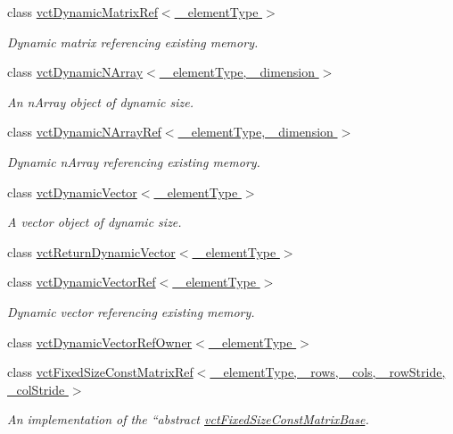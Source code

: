 \begin{DoxyCompactItemize}
class \hyperlink{classvct_dynamic_matrix_ref}{vct\+Dynamic\+Matrix\+Ref$<$ \+\_\+element\+Type $>$}
\begin{DoxyCompactList}\small\item\em Dynamic matrix referencing existing memory. \end{DoxyCompactList}\item 
class \hyperlink{classvct_dynamic_n_array}{vct\+Dynamic\+N\+Array$<$ \+\_\+element\+Type, \+\_\+dimension $>$}
\begin{DoxyCompactList}\small\item\em An n\+Array object of dynamic size. \end{DoxyCompactList}\item 
class \hyperlink{classvct_dynamic_n_array_ref}{vct\+Dynamic\+N\+Array\+Ref$<$ \+\_\+element\+Type, \+\_\+dimension $>$}
\begin{DoxyCompactList}\small\item\em Dynamic n\+Array referencing existing memory. \end{DoxyCompactList}\item 
class \hyperlink{classvct_dynamic_vector}{vct\+Dynamic\+Vector$<$ \+\_\+element\+Type $>$}
\begin{DoxyCompactList}\small\item\em A vector object of dynamic size. \end{DoxyCompactList}\item 
class \hyperlink{classvct_return_dynamic_vector}{vct\+Return\+Dynamic\+Vector$<$ \+\_\+element\+Type $>$}
\item 
class \hyperlink{classvct_dynamic_vector_ref}{vct\+Dynamic\+Vector\+Ref$<$ \+\_\+element\+Type $>$}
\begin{DoxyCompactList}\small\item\em Dynamic vector referencing existing memory. \end{DoxyCompactList}\item 
class \hyperlink{classvct_dynamic_vector_ref_owner}{vct\+Dynamic\+Vector\+Ref\+Owner$<$ \+\_\+element\+Type $>$}
\item 
class \hyperlink{classvct_fixed_size_const_matrix_ref}{vct\+Fixed\+Size\+Const\+Matrix\+Ref$<$ \+\_\+element\+Type, \+\_\+rows, \+\_\+cols, \+\_\+row\+Stride, \+\_\+col\+Stride $>$}
\begin{DoxyCompactList}\small\item\em An implementation of the ``abstract\textquotesingle{}\textquotesingle{} \hyperlink{classvct_fixed_size_const_matrix_base}{vct\+Fixed\+Size\+Const\+Matrix\+Base}. \end{DoxyCompactList}\item 

\end{DoxyCompactItemize}
